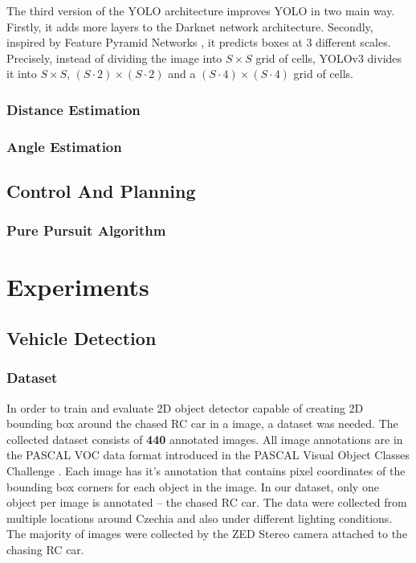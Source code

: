 The third version of the YOLO architecture improves YOLO in two main way. Firstly, it adds more layers to the Darknet network architecture. Secondly, inspired by Feature Pyramid Networks \cite{FPN}, it predicts boxes at 3 different scales. Precisely, instead of dividing the image into $S\times S$ grid of cells, YOLOv3 divides it into $S\times S$, $(S\cdot2)\times (S\cdot2)$ and a $(S\cdot4)\times (S\cdot4)$ grid of cells.


\subsection{Distance Estimation}
\subsection{Angle Estimation}

\section{Control And Planning}
\subsection{Pure Pursuit Algorithm}

\chapter{Experiments}

\section{Vehicle Detection}
\subsection{Dataset}
In order to train and evaluate 2D object detector capable of creating 2D bounding box around the chased RC car in a image, a dataset was needed. The collected dataset consists of \textbf{440} annotated images. All image annotations are in the PASCAL VOC data format introduced in the PASCAL Visual Object Classes Challenge \cite{pascal-voc}. Each image has it's annotation that contains pixel coordinates of the bounding box corners for each object in the image. In our dataset, only one object per image is annotated -- the chased RC car. The data were collected from multiple locations around Czechia and also under different lighting conditions. The majority of images were collected by the ZED Stereo camera attached to the chasing RC car. 


